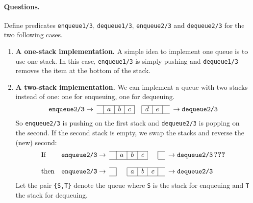 \paragraph{Questions.} Define predicates \texttt{enqueue1/3},
\texttt{dequeue1/3}, \texttt{enqueue2/3} and \texttt{dequeue2/3} for
the two following cases.
\begin{enumerate}

  \item \textbf{A one-stack implementation.} A simple idea to
    implement one queue is to use one stack. In this
    case, \texttt{enqueue1/3} is simply pushing
    and \texttt{dequeue1/3} removes the item at the bottom of the
    stack.

  \item \textbf{A two-stack implementation.} We can implement a
    queue with two stacks instead of one: one for enqueuing, one for
    dequeuing.
    \[
    \begin{array}{r@{\;}cc|c|c|c|c|c|c|cc@{\;}l}
      \cline{3-6}\cline{8-10}
      \texttt{enqueue2/3} & \rightarrow & & a & b & c & & d & e & &
      \rightarrow & \texttt{dequeue2/3}\\
      \cline{3-6}\cline{8-10}
    \end{array}
    \]
    \noindent So \texttt{enqueue2/3} is pushing on the first stack
    and \texttt{dequeue2/3} is popping on the second. If the second
    stack is empty, we swap the stacks and reverse the (new) second:
    \[
    \begin{array}{lr@{\;}cc|c|c|c|c|cc@{\;}l}
      \cline{4-7}\cline{9-9}
      \text{If} & \texttt{enqueue2/3} & \rightarrow & & a & b & c & & &
      \rightarrow & \texttt{dequeue2/3} \, \textbf{???}\\
      \cline{4-7}\cline{9-9}\\
      \cline{4-4}\cline{6-9}
      \text{then} & \texttt{enqueue2/3} & \rightarrow & & & a & b & c & &
      \rightarrow & \texttt{dequeue2/3}\\
      \cline{4-4}\cline{6-9}
    \end{array}
    \]
    \noindent Let the pair \texttt{\{S,T\}} denote the queue where
    \texttt{S} is the stack for enqueuing and \texttt{T} the stack for
    dequeuing.

\end{enumerate}

